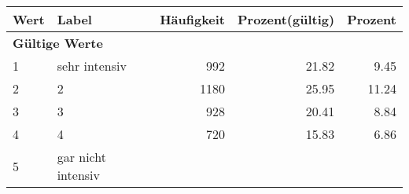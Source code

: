      \begin{longtable}{lXrrr}
     \toprule
     \textbf{Wert} & \textbf{Label} & \textbf{Häufigkeit} & \textbf{Prozent(gültig)} & \textbf{Prozent} \\
     \endhead
     \midrule
     \multicolumn{5}{l}{\textbf{Gültige Werte}}\\

     1 &
     \multicolumn{1}{X}{ sehr intensiv   } &


       \num{992} &
       \num[round-mode=places,round-precision=2]{21.82} &
         \num[round-mode=places,round-precision=2]{9.45} \\

     2 &
     \multicolumn{1}{X}{ 2   } &


       \num{1180} &
       \num[round-mode=places,round-precision=2]{25.95} &
         \num[round-mode=places,round-precision=2]{11.24} \\

     3 &
     \multicolumn{1}{X}{ 3   } &


       \num{928} &
       \num[round-mode=places,round-precision=2]{20.41} &
         \num[round-mode=places,round-precision=2]{8.84} \\

     4 &
     \multicolumn{1}{X}{ 4   } &


       \num{720} &
       \num[round-mode=places,round-precision=2]{15.83} &
         \num[round-mode=places,round-precision=2]{6.86} \\

     5 &
     \multicolumn{1}{X}{ gar nicht intensiv   } &



\end{longtable}
